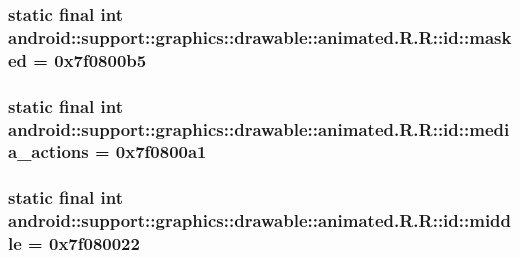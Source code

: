 \hypertarget{classandroid_1_1support_1_1graphics_1_1drawable_1_1animated_1_1_r_1_1id_1d37b4a0d43991b2af982571370a8ec7}{
\subsubsection[{masked}]{\setlength{\rightskip}{0pt plus 5cm}static final int android::support::graphics::drawable::animated.R.R::id::masked = 0x7f0800b5}}
\label{classandroid_1_1support_1_1graphics_1_1drawable_1_1animated_1_1_r_1_1id_1d37b4a0d43991b2af982571370a8ec7}


\hypertarget{classandroid_1_1support_1_1graphics_1_1drawable_1_1animated_1_1_r_1_1id_2647ef9ca644063479926e67beee32d4}{
\subsubsection[{media\_\-actions}]{\setlength{\rightskip}{0pt plus 5cm}static final int android::support::graphics::drawable::animated.R.R::id::media\_\-actions = 0x7f0800a1}}
\label{classandroid_1_1support_1_1graphics_1_1drawable_1_1animated_1_1_r_1_1id_2647ef9ca644063479926e67beee32d4}


\hypertarget{classandroid_1_1support_1_1graphics_1_1drawable_1_1animated_1_1_r_1_1id_c730a1bd8b28e7642207e97380dc5093}{
\subsubsection[{middle}]{\setlength{\rightskip}{0pt plus 5cm}static final int android::support::graphics::drawable::animated.R.R::id::middle = 0x7f080022}}
\label{classandroid_1_1support_1_1graphics_1_1drawable_1_1animated_1_1_r_1_1id_c730a1bd8b28e7642207e97380dc5093}



